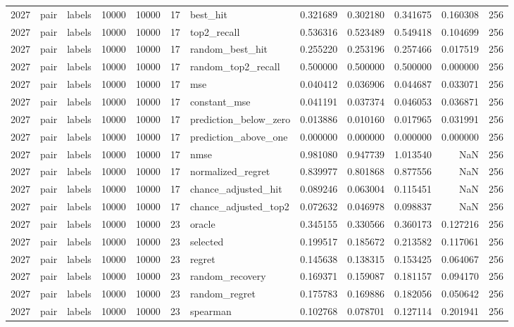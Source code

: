 \begin{tabular}{rllrrrlrrrrr}
2027 & pair & labels & 10000 & 10000 & 17 & best_hit & 0.321689 & 0.302180 & 0.341675 & 0.160308 & 256 \\
2027 & pair & labels & 10000 & 10000 & 17 & top2_recall & 0.536316 & 0.523489 & 0.549418 & 0.104699 & 256 \\
2027 & pair & labels & 10000 & 10000 & 17 & random_best_hit & 0.255220 & 0.253196 & 0.257466 & 0.017519 & 256 \\
2027 & pair & labels & 10000 & 10000 & 17 & random_top2_recall & 0.500000 & 0.500000 & 0.500000 & 0.000000 & 256 \\
2027 & pair & labels & 10000 & 10000 & 17 & mse & 0.040412 & 0.036906 & 0.044687 & 0.033071 & 256 \\
2027 & pair & labels & 10000 & 10000 & 17 & constant_mse & 0.041191 & 0.037374 & 0.046053 & 0.036871 & 256 \\
2027 & pair & labels & 10000 & 10000 & 17 & prediction_below_zero & 0.013886 & 0.010160 & 0.017965 & 0.031991 & 256 \\
2027 & pair & labels & 10000 & 10000 & 17 & prediction_above_one & 0.000000 & 0.000000 & 0.000000 & 0.000000 & 256 \\
2027 & pair & labels & 10000 & 10000 & 17 & nmse & 0.981080 & 0.947739 & 1.013540 & NaN & 256 \\
2027 & pair & labels & 10000 & 10000 & 17 & normalized_regret & 0.839977 & 0.801868 & 0.877556 & NaN & 256 \\
2027 & pair & labels & 10000 & 10000 & 17 & chance_adjusted_hit & 0.089246 & 0.063004 & 0.115451 & NaN & 256 \\
2027 & pair & labels & 10000 & 10000 & 17 & chance_adjusted_top2 & 0.072632 & 0.046978 & 0.098837 & NaN & 256 \\
2027 & pair & labels & 10000 & 10000 & 23 & oracle & 0.345155 & 0.330566 & 0.360173 & 0.127216 & 256 \\
2027 & pair & labels & 10000 & 10000 & 23 & selected & 0.199517 & 0.185672 & 0.213582 & 0.117061 & 256 \\
2027 & pair & labels & 10000 & 10000 & 23 & regret & 0.145638 & 0.138315 & 0.153425 & 0.064067 & 256 \\
2027 & pair & labels & 10000 & 10000 & 23 & random_recovery & 0.169371 & 0.159087 & 0.181157 & 0.094170 & 256 \\
2027 & pair & labels & 10000 & 10000 & 23 & random_regret & 0.175783 & 0.169886 & 0.182056 & 0.050642 & 256 \\
2027 & pair & labels & 10000 & 10000 & 23 & spearman & 0.102768 & 0.078701 & 0.127114 & 0.201941 & 256 \\

\end{tabular}
